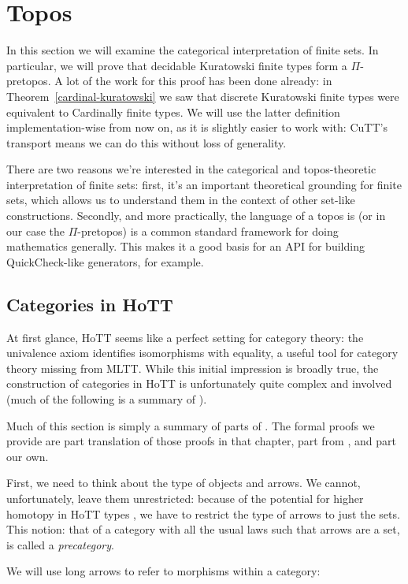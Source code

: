 \chapter{Topos} \label{topos}
In this section we will examine the categorical interpretation of finite sets.
In particular, we will prove that decidable Kuratowski finite types form a
\(\Pi\)-pretopos.
A lot of the work for this proof has been done already: in
Theorem~\ref{cardinal-kuratowski} we saw that discrete Kuratowski finite types
were equivalent to Cardinally finite types.
We will use the latter definition implementation-wise from now on, as it is
slightly easier to work with: CuTT's transport means we can do this without loss
of generality.

There are two reasons we're interested in the categorical and topos-theoretic
interpretation of finite sets: first, it's an important theoretical grounding
for finite sets, which allows us to understand them in the context of other
set-like constructions.
Secondly, and more practically, the language of a topos is (or in our case the
\(\Pi\)-pretopos) is a common standard framework for doing mathematics
generally.
This makes it a good basis for an API for building QuickCheck-like generators,
for example.
\section{Categories in HoTT}
At first glance, HoTT seems like a perfect setting for category theory: the
univalence axiom identifies isomorphisms with equality, a useful tool for
category theory missing from MLTT.
While this initial impression is broadly true, the construction of categories in
HoTT is unfortunately quite complex and involved (much of the following is a
summary of \citet[chapter 9]{hottbook}).

Much of this section is simply a summary of parts of \citet[chapter
9]{hottbook}.
The formal proofs we provide are part translation of those proofs in that
chapter, part from \citep{iversenFredefoxCat2018}
\citep{huProofrelevantCategoryTheory2020}, and part our own.

First, we need to think about the type of objects and arrows.
We cannot, unfortunately, leave them unrestricted: because of the potential for
higher homotopy in HoTT types , we have
to restrict the type of arrows to just the sets.
This notion: that of a category with all the usual laws such that arrows are a
set, is called a \emph{precategory}.
\begin{agdalisting}
\end{agdalisting}
We will use long arrows to refer to morphisms within a category:
\begin{agdalisting}
\end{agdalisting}

